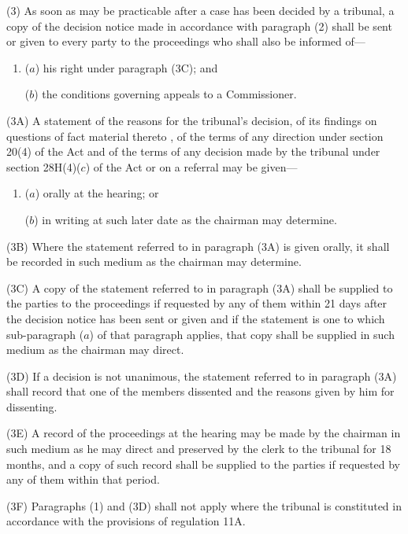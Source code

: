 \documentclass[12pt,a4paper]{article}
\begin{document}
(3) As soon as may be practicable after a case has been decided by a tribunal, a copy of the decision notice made in accordance with paragraph (2) shall be sent or given to every party to the proceedings who shall also be informed of—
\begin{enumerate}\item[]
($a$) his right under paragraph (3C); and

($b$) the conditions governing appeals to a Commissioner.
\end{enumerate}

(3A) A statement of the reasons for the tribunal’s decision, of its findings on questions of fact material thereto%
, of the terms of any direction under section 20(4) of the Act and of the terms of any decision made by the tribunal under section 28H(4)($c$) of the Act or on a referral  %
may be given—
\begin{enumerate}\item[]
($a$) orally at the hearing; or

($b$) in writing at such later date as the chairman may determine.
\end{enumerate}

(3B) Where the statement referred to in paragraph (3A) is given orally, it shall be recorded in such medium as the chairman may determine.

(3C) A copy of the statement referred to in paragraph (3A) shall be supplied to the parties to the proceedings if requested by any of them within 21 days after the decision notice has been sent or given and if the statement is one to which sub-paragraph ($a$) of that paragraph applies, that copy shall be supplied in such medium as the chairman may direct.

(3D) If a decision is not unanimous, the statement referred to in paragraph (3A) shall record that one of the members dissented and the reasons given by him for dissenting.

(3E) A record of the proceedings at the hearing may be made by the chairman in such medium as he may direct and preserved by the clerk to the tribunal for 18 months, and a copy of such record shall be supplied to the parties if requested by any of them within that period.

(3F) Paragraphs (1) and (3D) shall not apply where the tribunal is constituted in accordance with the provisions of regulation 11A.
\end{document}
